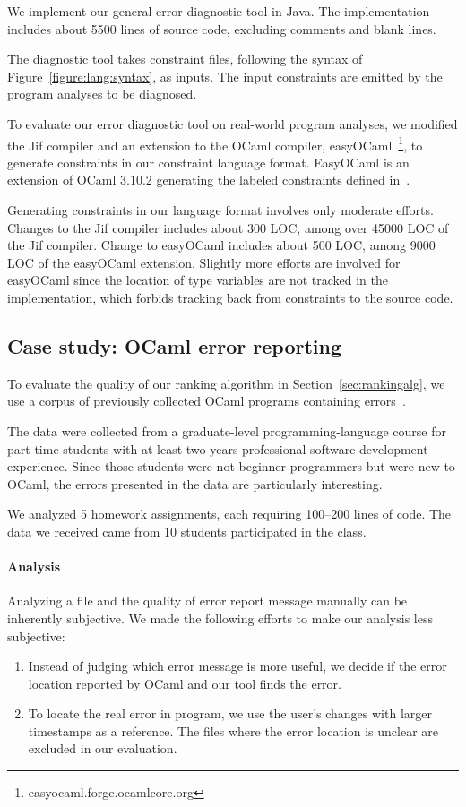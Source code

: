 We implement our general error diagnostic tool in Java. The
implementation includes about 5500 lines of source code, excluding
comments and blank lines.

The diagnostic tool takes constraint files, following the syntax of
Figure~\ref{figure:lang:syntax}, as inputs. The input constraints are
emitted by the program analyses to be diagnosed.

To evaluate our error diagnostic tool on real-world program analyses,
we modified the Jif compiler and an extension to the OCaml compiler,
easyOCaml~\footnote{easyocaml.forge.ocamlcore.org}, to generate
constraints in our constraint language format. EasyOCaml is an
extension of OCaml 3.10.2 generating the labeled constraints defined
in~\cite{haack:slicing}.

Generating constraints in our language format involves only moderate
efforts. Changes to the Jif compiler includes about 300 LOC, among
over 45000 LOC of the Jif compiler. Change to easyOCaml includes about
500 LOC, among 9000 LOC of the easyOCaml extension.  Slightly more
efforts are involved for easyOCaml since the location of type
variables are not tracked in the implementation, which forbids
tracking back from constraints to the source code.

\subsection{Case study: OCaml error reporting}

To evaluate the quality of our ranking algorithm in
Section~\ref{sec:rankingalg}, we use a corpus of previously collected
OCaml programs containing errors~\cite{lerner:pldi07}.

The data were collected from a graduate-level programming-language
course for part-time students with at least two years professional
software development experience. Since those students were not
beginner programmers but were new to OCaml, the errors presented in
the data are particularly interesting.

We analyzed 5 homework assignments, each requiring 100--200 lines of
code. The data we received came from 10 students participated in the
class.

\paragraph{Analysis}

Analyzing a file and the quality of error report message manually can
be inherently subjective. We made the following efforts to make our
analysis less subjective:
\begin{enumerate}
\item Instead of judging which error message is more useful, we decide
if the error location reported by OCaml and our tool finds the error.

\item To locate the real error in program, we use the user's changes
with larger timestamps as a reference. The files where the error
location is unclear are excluded in our evaluation.
\end{enumerate}

